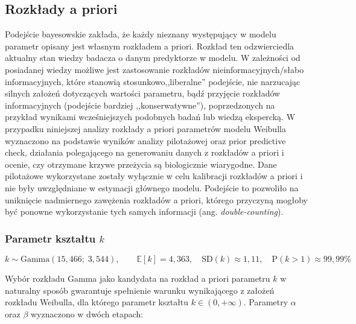 \documentclass[12pt, a4paper]{article}
\begin{document}
\subsection{Rozkłady a priori}\label{subsec:priors}
Podejście bayesowskie zakłada, że każdy nieznany występujący w modelu parametr opisany jest własnym rozkładem a priori. Rozkład ten odzwierciedla aktualny stan wiedzy badacza o danym predyktorze w modelu. W zależności od posiadanej wiedzy możliwe jest zastosowanie rozkładów nieinformacyjnych/słabo informacyjnych, które stanowią stosunkowo,,liberalne'' podejście, nie narzucając silnych założeń dotyczących wartości parametru, bądź przyjęcie rozkładów informacyjnych (podejście bardziej ,,konserwatywne''), poprzedzonych na przykład wynikami wcześniejszych podobnych badań lub wiedzą ekspercką. W przypadku niniejszej analizy rozkłady a priori parametrów modelu Weibulla wyznaczono na podstawie wyników analizy pilotażowej oraz prior predictive check, działania polegającego na generowaniu danych z rozkładów a priori i ocenie, czy otrzymane krzywe przeżycia są biologicznie wiarygodne. Dane pilotażowe wykorzystane zostały wyłącznie w celu kalibracji rozkładów a priori i nie były uwzględniane w estymacji głównego modelu. Podejście to pozwoliło na uniknięcie nadmiernego zawężenia rozkładów a priori, którego przyczyną mogłoby być ponowne wykorzystanie tych samych informacji (ang. \textit{double-counting}).

\subsubsection{Parametr kształtu $k$}

\begin{equation}
    k \sim \mathrm{Gamma}(15{,}466;\; 3{,}544), \qquad \mathbb{E}[k] = 4{,}363, \quad \mathrm{SD}(k) \approx 1{,}11, \quad \mathrm{P}(k > 1) \approx 99{,}99\%
    \label{eq:prior_k}
\end{equation}

Wybór rozkładu Gamma jako kandydata na rozkład a priori parametru $k$ w naturalny sposób gwarantuje spełnienie warunku wynikającego z założeń rozkładu Weibulla, dla którego parametr kształtu $k \in \left(0, +\infty\right)$. Parametry $\alpha$ oraz $\beta$ wyznaczono w dwóch etapach:
\end{document}
